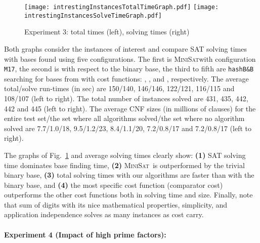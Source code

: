 \documentclass[envcountsame]{llncs}
\newcommand\minisatp{\textsc{MiniSat}}
\begin{document}
\begin{figure}
  \centering
  \vspace{-5ex}
  \texttt{[image: intrestingInstancesTotalTimeGraph.pdf]}
  \texttt{[image: intrestingInstancesSolveTimeGraph.pdf]}
\vspace{-3ex}
  \caption{Experiment 3: total times (left), solving times (right) }
 \vspace{-5ex}
\label{fig:results2}
\end{figure}
\noindent Both graphs consider the  instances of interest and compare
SAT solving times with bases found using five configurations.  The first is \minisatp with
configuration \texttt{M17}, the second is with respect to the binary
base, the third to fifth are \texttt{hashB\&B}
searching for bases from 
with cost functions: , , and
, respectively.
The average total/solve run-times (in sec) are 150/140, 146/146,
122/121, 116/115 and 108/107 (left to right). The total number of
instances solved are 431, 435, 442, 442 and 445 (left to right).  
The average CNF sizes (in millions of clauses) for the entire
test set/the set where all algorithms solved/the set where
no algorithm solved are 7.7/1.0/18,
9.5/1.2/23, 8.4/1.1/20, 7.2/0.8/17
and 7.2/0.8/17 (left to right).  

The graphs of Fig.~\ref{fig:results2} and average solving times
clearly show: \textbf{(1)} SAT solving time dominates base
finding time, \textbf{(2)} \minisatp\ is outperformed by the trivial
binary base,  \textbf{(3)}
total solving times with our algorithms are faster than with the binary
base, and \textbf{(4)} the most specific
cost function (comparator cost) outperforms the other cost functions
both in solving time and size.  Finally, note that sum of
digits with its nice mathematical properties, simplicity, and
application independence solves as many instances as cost carry.




\paragraph{Experiment 4 (Impact of high prime factors):}
\end{document}
